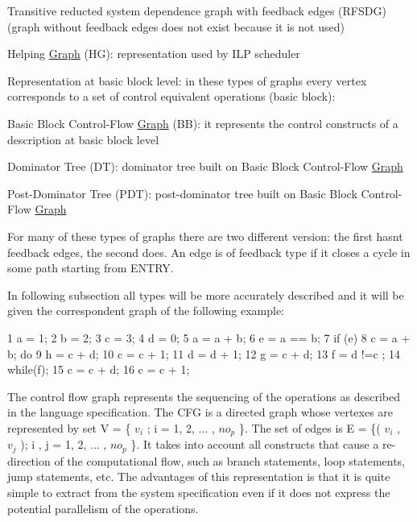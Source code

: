 \begin{DoxyItemize}
\begin{DoxyItemize}
\item Transitive reducted system dependence graph with feedback edges (R\+F\+S\+DG) (graph without feedback edges does not exist because it is not used)
\item Helping \hyperlink{structGraph}{Graph} (HG)\+: representation used by I\+LP scheduler
\end{DoxyItemize}
\item Representation at basic block level\+: in these types of graphs every vertex corresponds to a set of control equivalent operations (basic block)\+:
\begin{DoxyItemize}
\item Basic Block Control-\/\+Flow \hyperlink{structGraph}{Graph} (BB)\+: it represents the control constructs of a description at basic block level
\item Dominator Tree (DT)\+: dominator tree built on Basic Block Control-\/\+Flow \hyperlink{structGraph}{Graph}
\item Post-\/\+Dominator Tree (P\+DT)\+: post-\/dominator tree built on Basic Block Control-\/\+Flow \hyperlink{structGraph}{Graph}
\end{DoxyItemize}
\end{DoxyItemize}

For many of these types of graphs there are two different version\+: the first hasn\textquotesingle{}t feedback edges, the second does. An edge is of feedback type if it closes a cycle in some path starting from E\+N\+T\+RY.

In following subsection all types will be more accurately described and it will be given the correspondent graph of the following example\+: \begin{DoxyVerb} 1  a = 1;
 2  b = 2;
 3  c = 3;
 4  d = 0;
 5  a = a + b;
 6  e = a == b;
 7  if (e)
    {
 8    c = a + b;
      do
      {
 9      h = c + d;
10      c = c + 1;
11      d = d + 1;
12      g = c + d;
13      f = d !=c ;
      }
14    while(f);
    }
15  c = c + d;
16  c = c + 1;
\end{DoxyVerb}


The control flow graph represents the sequencing of the operations as described in the language specification. The C\+FG is a directed graph whose vertexes are represented by set V = \{ $v_i$ ; i = 1, 2, ... , $no_p$ \}. The set of edges is E = \{( $v_i$ , $v_j$ ); i , j = 1, 2, ... , $no_p$ \}. It takes into account all constructs that cause a re-\/direction of the computational flow, such as branch statements, loop statements, jump statements, etc. The advantages of this representation is that it is quite simple to extract from the system specification even if it does not express the potential parallelism of the operations.

